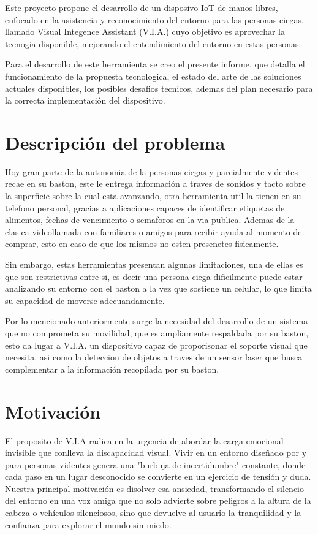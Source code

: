 \documentclass{article}
\begin{document}
    Este proyecto propone el desarrollo de un disposivo IoT de manos libres, enfocado en la asistencia y reconocimiento del entorno para las personas ciegas, llamado Visual Integence Assistant (V.I.A.) cuyo objetivo es aprovechar
    la tecnogia disponible, mejorando el entendimiento del entorno en estas personas.

    Para el desarrollo de este herramienta se creo el presente informe, que detalla el funcionamiento de la propuesta tecnologica, el estado del arte de las soluciones actuales disponibles, los posibles desafios tecnicos, ademas del plan necesario
    para la correcta implementación del dispositivo. 


    \newpage
    \section{Descripción del problema}
    Hoy gran parte de la autonomia de la personas ciegas y parcialmente videntes recae en su baston, este le entrega información a traves de sonidos y tacto sobre la superficie sobre la cual esta avanzando, otra herramienta util la tienen
    en su telefono personal, gracias a aplicaciones capaces de identificar etiquetas de alimentos, fechas de vencimiento o semaforos en la via publica. Ademas de la clasica videollamada con familiares o amigos para recibir ayuda al momento de comprar,
    esto en caso de que los mismos no esten presenetes fisicamente.

    Sin embargo, estas herramientas presentan algunas limitaciones, una de ellas es que son restrictivas entre si, es decir una persona ciega dificilmente puede estar analizando su entorno con el baston a la vez que sostiene un celular, lo que limita su
    capacidad de moverse adecuandamente.

    Por lo mencionado anteriormente surge la necesidad del desarrollo de un sistema que no comprometa su movilidad, que es ampliamente respaldada por su baston, esto da lugar a V.I.A. un dispositivo capaz de proporisonar el soporte visual que necesita, asi como la deteccion
    de objetos a traves de un sensor laser que busca complementar a la información recopilada por su baston.

    \newpage
    \section{Motivación}
    El proposito de V.I.A radica en la urgencia de abordar la carga emocional invisible que conlleva la discapacidad visual. Vivir en un entorno   diseñado por y para personas videntes genera una "burbuja de incertidumbre" constante, donde cada paso en un lugar desconocido se convierte en un ejercicio de tensión y duda. Nuestra principal motivación es disolver esa ansiedad, transformando el silencio del entorno en una voz amiga que no solo advierte sobre peligros a la altura de la cabeza o vehículos silenciosos, sino que devuelve al usuario la tranquilidad y la confianza para explorar el mundo sin miedo. \\
\end{document}

